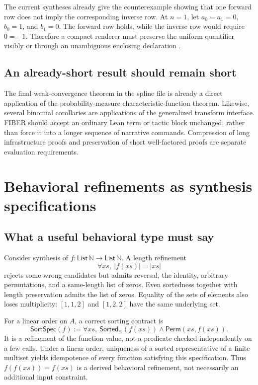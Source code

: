 \documentclass[11pt,letterpaper]{article}
\theoremstyle{definition}\newtheorem{definition}[theorem]{Definition}
\newcommand{\N}{\mathbb N}\newcommand{\Z}{\mathbb Z}\newcommand{\Q}{\mathbb Q}\newcommand{\R}{\mathbb R}\newcommand{\C}{\mathbb C}
\begin{document}
The current syntheses already give the counterexample showing that one forward row does not imply the corresponding inverse row. At $n=1$, let $a_0=a_1=0$, $b_0=1$, and $b_1=0$. The forward row holds, while the inverse row would require $0=-1$. Therefore a compact renderer must preserve the uniform quantifier visibly or through an unambiguous enclosing declaration \cite{reportA,reportB}.

\subsection{An already-short result should remain short}
The final weak-convergence theorem in the spline file is already a direct application of the probability-measure characteristic-function theorem. Likewise, several binomial corollaries are applications of the generalized transform interface. FIBER should accept an ordinary Lean term or tactic block unchanged, rather than force it into a longer sequence of narrative commands. Compression of long infrastructure proofs and preservation of short well-factored proofs are separate evaluation requirements.

\section{Behavioral refinements as synthesis specifications}\label{sec:synthesis}
\subsection{What a useful behavioral type must say}
Consider synthesis of $f:\mathsf{List}\,\N\to\mathsf{List}\,\N$. A length refinement
\[
 \forall xs,\ |f(xs)|=|xs|
\]
rejects some wrong candidates but admits reversal, the identity, arbitrary permutations, and a same-length list of zeros. Even sortedness together with length preservation admits the list of zeros. Equality of the sets of elements also loses multiplicity: $[1,1,2]$ and $[1,2,2]$ have the same underlying set.

For a linear order on $A$, a correct sorting contract is
\[
 \mathsf{SortSpec}(f):=
 \forall xs,\ \mathsf{Sorted}_{\le}(f(xs))\land\mathsf{Perm}(xs,f(xs)).
\]
It is a refinement of the function value, not a predicate checked independently on a few calls. Under a linear order, uniqueness of a sorted representative of a finite multiset yields idempotence of every function satisfying this specification. Thus $f(f(xs))=f(xs)$ is a derived behavioral refinement, not necessarily an additional input constraint.
\end{document}
